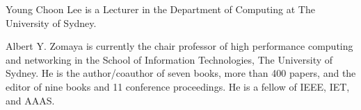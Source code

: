 \documentclass[10pt,journal,cspaper,compsoc]{IEEEtran}
\begin{document}
\begin{IEEEbiographynophoto}{Young Choon Lee}
is a Lecturer in the Department of Computing at The University of Sydney.
\end{IEEEbiographynophoto}

\begin{IEEEbiographynophoto}{Albert Y. Zomaya}
is currently the chair professor of high performance computing and networking in the School of Information Technologies, The University of Sydney. He is the author/coauthor of seven books, more than 400 papers, and the editor of nine books and 11 conference proceedings. He is a fellow of IEEE, IET, and AAAS.
\end{IEEEbiographynophoto}
\end{document}
